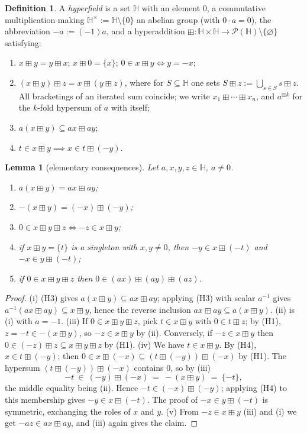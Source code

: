 \documentclass[11pt]{article}
\newtheorem{lemma}[theorem]{Lemma}
\theoremstyle{definition}
\newtheorem{definition}[theorem]{Definition}
\theoremstyle{remark}
\newcommand{\Hb}{\mathbb{H}}
\newcommand{\bp}{\boxplus}
\begin{document}
\begin{definition}\label{def:hf}
A \emph{hyperfield} is a set $\Hb$ with an element $0$, a commutative
multiplication making $\Hb^\times:=\Hb\setminus\{0\}$ an abelian group
(with $0\cdot a=0$), the abbreviation $-a:=(-1)a$, and a hyperaddition
$\bp:\Hb\times\Hb\to\mathcal P(\Hb)\setminus\{\varnothing\}$ satisfying:
\begin{enumerate}[label=(H\arabic*)]
\item $x\bp y=y\bp x$;\; $x\bp0=\{x\}$;\; $0\in x\bp y\iff y=-x$;
\item $(x\bp y)\bp z=x\bp(y\bp z)$, where for $S\subseteq\Hb$ one sets
$S\bp z:=\bigcup_{s\in S}s\bp z$. All bracketings of an iterated sum
coincide; we write $x_1\bp\cdots\bp x_n$, and $a^{\bp k}$ for the $k$-fold
hypersum of $a$ with itself;
\item $a(x\bp y)\subseteq ax\bp ay$;
\item $t\in x\bp y\implies x\in t\bp(-y)$.
\end{enumerate}
\end{definition}

\begin{lemma}[elementary consequences]\label{lem:basic}
Let $a,x,y,z\in\Hb$, $a\neq0$.
\begin{enumerate}[label=\textup{(\roman*)}]
\item $a(x\bp y)=ax\bp ay$;
\item $-(x\bp y)=(-x)\bp(-y)$;
\item $0\in x\bp y\bp z\iff -z\in x\bp y$;
\item if $x\bp y=\{t\}$ is a singleton with $x,y\neq0$, then
$-y\in x\bp(-t)$ and $-x\in y\bp(-t)$;
\item if $0\in x\bp y\bp z$ then $0\in(ax)\bp(ay)\bp(az)$.
\end{enumerate}
\end{lemma}

\begin{proof}
(i) (H3) gives $a(x\bp y)\subseteq ax\bp ay$; applying (H3) with scalar
$a^{-1}$ gives $a^{-1}(ax\bp ay)\subseteq x\bp y$, hence the reverse
inclusion $ax\bp ay\subseteq a(x\bp y)$.
(ii) is (i) with $a=-1$.
(iii) If $0\in x\bp y\bp z$, pick $t\in x\bp y$ with $0\in t\bp z$; by
(H1), $z=-t\in-(x\bp y)$, so $-z\in x\bp y$ by (ii). Conversely, if
$-z\in x\bp y$ then $0\in(-z)\bp z\subseteq x\bp y\bp z$ by (H1).
(iv) We have $t\in x\bp y$. By (H4), $x\in t\bp(-y)$; then
$0\in x\bp(-x)\subseteq(t\bp(-y))\bp(-x)$ by (H1). The hypersum
$(t\bp(-y))\bp(-x)$ contains $0$, so by (iii)
\[
  -t\ \in\ (-y)\bp(-x)\ =\ -(x\bp y)\ =\ \{-t\},
\]
the middle equality being (ii). Hence $-t\in(-x)\bp(-y)$; applying (H4)
to this membership gives $-y\in x\bp(-t)$. The proof of
$-x\in y\bp(-t)$ is symmetric, exchanging the roles of $x$ and $y$.
(v) From $-z\in x\bp y$ (iii) and (i) we get $-az\in ax\bp ay$, and
(iii) again gives the claim.
\end{proof}
\end{document}
